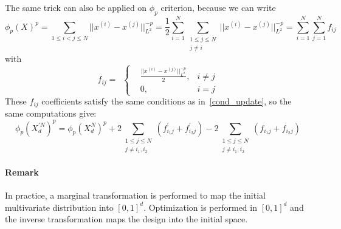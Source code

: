 {The same trick can also be applied on $\phi_p$ criterion, because we can write
 \begin{equation}
  \phi_p(X)^p
  = \sum_{1\leq i < j \leq N} ||x^{(i)} - x^{(j)}||^{-p}_{L^2}
  = \frac{1}{2} \sum_{i=1}^N \sum_{\substack{1\leq j\leq N\\j\neq i}} ||x^{(i)} - x^{(j)}||^{-p}_{L^2}
  = \sum_{i=1}^N \sum_{j=1}^N f_{ij}
 \end{equation}
with
 \begin{equation}
f_{ij}= \,\,\,\left \{
\begin{aligned}
& \frac{||x^{(i)} - x^{(j)}||^{-p}_{L^2}}{2}, & i \neq j\\
& 0, & i=j
\end{aligned}
\right.
\end{equation}
These $f_{ij}$ coefficients satisfy the same conditions as in~\eqref{cond_update}, so the same computations give:
\begin{equation*}
\phi_p(X_{d}^{\prime N})^p = \phi_p(X_{d}^N)^p
  + 2\sum_{\substack{1\leq j\leq N\\j\neq i_1,i_2}} (f^{\prime}_{i_1j}+f^{\prime}_{i_2j})
  - 2\sum_{\substack{1\leq j\leq N\\j\neq i_1,i_2}} (f_{i_1j}+f_{i_2j})
\end{equation*}

\paragraph{Remark} In practice, a marginal transformation is performed to map the initial multivariate distribution into $[0,1]^d$. Optimization is performed in $[0,1]^d$
and the inverse transformation maps the design into the initial space.
}
{
}


